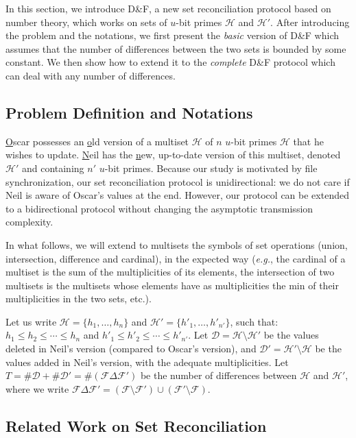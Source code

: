 \documentclass[twoside,envcountsame,runningheads]{llncs}
\newcommand{\Set}{\mathcal{H}}
\newcommand{\SetD}{\mathcal{D}}
\newcommand{\Files}{\mathcal{F}}
\newcommand{\df}{D\&F\xspace}
\newcommand{\eg}{\textit{e.g.}\xspace}
\newcommand{\comm}[1]{\todo{#1}}
\begin{document}
In this section, we introduce \df, a new set reconciliation protocol based on number theory, which works on sets of $u$-bit primes $\Set$ and $\Set'$.
After introducing the problem and the notations, we first present the \emph{basic} version of \df which assumes that the number of differences between the two sets is bounded by some constant.
We then show how to extend it to the \emph{complete} \df protocol which can deal with any number of differences.

\subsection{Problem Definition and Notations}

\underline{O}scar possesses an \underline{o}ld version of a multiset $\Set$ of $n$ $u$-bit primes $\Set$ that he wishes to update.
\underline{N}eil has the \underline{n}ew, up-to-date version of this multiset, denoted $\Set'$ and containing $n'$ $u$-bit primes.
Because our study is motivated by file synchronization, our set reconciliation protocol is unidirectional: we do not care if Neil is aware of Oscar's values at the end. However, our protocol can be extended to a bidirectional protocol without changing the asymptotic transmission complexity.

In what follows, we will extend to multisets the symbols of set operations (union, intersection, difference and cardinal), in the expected way (\eg, the cardinal of a multiset is the sum of the multiplicities of its elements, the intersection of two multisets is the multisets whose elements have as multiplicities the min of their multiplicities in the two sets, etc.).

Let us write $\Set = \{h_1,\dots,h_n\}$ and $\Set' = \{h'_1,\dots,h'_{n'}\}$, such that: $h_1 \leq h_2 \leq \cdots \leq h_n$ and $h'_1 \leq h'_2 \leq \cdots \leq h'_{n'}$.
Let $\SetD = \Set \setminus \Set'$ be the values deleted in Neil's version (compared to Oscar's version), and $\SetD' = \Set' \setminus \Set$ be the values added in Neil's version, with the adequate multiplicities.
Let $T = \# \SetD + \# \SetD' = \# \left( \Files \Delta \Files' \right)$ be the number of differences between $\Set$ and $\Set'$, where we write
$ \Files \Delta \Files' = (\Files \setminus \Files') \cup (\Files' \setminus \Files)$.

\subsection{Related Work on Set Reconciliation}\label{sec:related-work}
\end{document}
